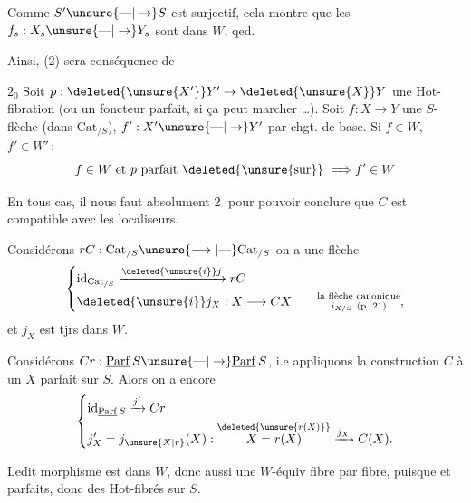 
Comme $S'\unsure{\text{---}|\to}S$ est surjectif, cela montre que les $f_s:X_s\unsure{\text{---}|\to}Y_s$ sont dans $W$, qed.

Ainsi, (2) sera conséquence de

\textcircled{$2_0$} Soit $p:\deleted{\unsure{X'}}Y'\to\deleted{\unsure{X}}Y$ une Hot-fibration (ou  un foncteur parfait, si ça peut marcher \ldots). Soit $f:X\to Y$ une $S$-flèche (dans $\mathrm{Cat}_{/S}$),  $f':X'\unsure{\text{---}|\to}Y'$ par chgt. de base. Si $f\in W$, $f'\in W'$\,:
\[ f\in W\ \text{et}\ p\ \text{parfait}\ \deleted{\unsure{\text{sur}}}\ \Longrightarrow f'\in W \]

En tous cas, il nous faut absolument \textcircled{2} pour pouvoir conclure que $C$ est compatible avec les localiseurs.

Considérons $rC:\mathrm{Cat}_{/S}\unsure{\longrightarrow|\text{---}}\mathrm{Cat}_{/S}$ on a une flèche
\[
\left\{\begin{aligned}
&\mathrm{id}_{\mathrm{Cat}_{/S}}\xrightarrow{\deleted{\unsure{i}}j}rC\\
&\deleted{\unsure{i}}j_X:X\longrightarrow CX\qquad \substack{\text{la flèche canonique}\\ i_{X/S}\ (\text{p.~21})},
\end{aligned}\right.
\]
et $j_X$ est tjrs dans $W$.

Considérons $Cr:\underline{\mathrm{Parf}}\,S\unsure{\text{---}|\to}\underline{\mathrm{Parf}}\,S$, i.e appliquons la construction $C$ à un $X$ parfait sur $S$. Alors on a encore
\[
\left\{\begin{aligned}
&\mathrm{id}_{\underline{\mathrm{Parf}}\,S}\xrightarrow{j'}Cr\\
&j'_X=j_{\unsure{X|r}}(X):\overset{\deleted{\unsure{r(X)}}}{X=r(X)}\xrightarrow{j_X}C(X).
\end{aligned}\right.
\]

Ledit morphisme est dans $W$, donc aussi une $W$-équiv fibre par fibre, puisque  et   parfaits, donc des Hot-fibrés sur $S$.

